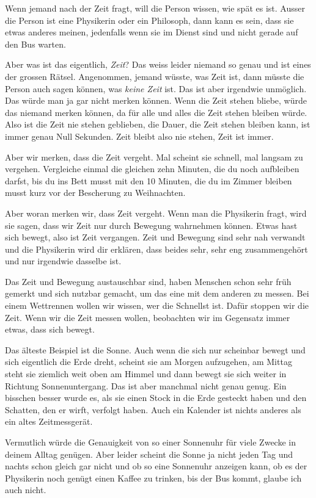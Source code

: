 
\lettrine[lines=2, lhang=.2, loversize=.25, lraise=0.05, findent=0.1em, nindent=0em]{W}{}enn jemand nach der Zeit fragt, will die Person wissen,
wie spät es ist. Ausser die Person ist eine Physikerin oder ein Philosoph, dann
kann es sein, dass sie etwas anderes meinen, jedenfalls wenn sie im Dienst sind
und nicht gerade auf den Bus warten.

Aber was ist das eigentlich, \textit{Zeit}? Das weiss leider niemand so genau
und ist eines der grossen Rätsel. Angenommen, jemand wüsste, was Zeit ist, dann
müsste die Person auch sagen können, was \textit{keine Zeit} ist. Das ist aber
irgendwie unmöglich. Das würde man ja gar nicht merken können. Wenn die Zeit
stehen bliebe, würde das niemand merken können, da für alle und alles die Zeit
stehen bleiben würde. Also ist die Zeit nie stehen geblieben, die Dauer, die
Zeit stehen bleiben kann, ist immer genau Null Sekunden. Zeit bleibt also nie
stehen, Zeit ist immer.

Aber wir merken, dass die Zeit vergeht. Mal scheint sie schnell, mal langsam zu
vergehen. Vergleiche einmal die gleichen zehn Minuten, die du noch aufbleiben
darfst, bis du ins Bett musst mit den 10 Minuten, die du im Zimmer bleiben
musst kurz vor der Bescherung zu Weihnachten.

Aber woran merken wir, dass Zeit vergeht. Wenn man die Physikerin fragt, wird
sie sagen, dass wir Zeit nur durch Bewegung wahrnehmen können. Etwas hast sich
bewegt, also ist Zeit vergangen. Zeit und Bewegung sind sehr nah verwandt und
die Physikerin wird dir erklären, dass beides sehr, sehr eng zusammengehört und
nur irgendwie dasselbe ist.

Das Zeit und Bewegung austauschbar sind, haben Menschen schon sehr früh gemerkt
und sich nutzbar gemacht, um das eine mit dem anderen zu messen. Bei einem
Wettrennen wollen wir wissen, wer die Schnellst ist. Dafür stoppen wir die
Zeit. Wenn wir die Zeit messen wollen, beobachten wir im Gegensatz immer etwas,
dass sich bewegt.

Das älteste Beispiel ist die Sonne. Auch wenn die sich nur scheinbar bewegt und
sich eigentlich die Erde dreht, scheint sie am Morgen aufzugehen, am Mittag
steht sie ziemlich weit oben am Himmel und dann bewegt sie sich weiter in
Richtung Sonnenuntergang. Das ist aber manchmal nicht genau genug. Ein bisschen
besser wurde es, als sie einen Stock in die Erde gesteckt haben und den
Schatten, den er wirft, verfolgt haben. Auch ein Kalender ist nichts anderes
als ein altes Zeitmessgerät.

Vermutlich würde die Genauigkeit von so einer Sonnenuhr für viele Zwecke in
deinem Alltag genügen. Aber leider scheint die Sonne ja nicht jeden Tag und
nachts schon gleich gar nicht und ob so eine Sonnenuhr anzeigen kann, ob es
der Physikerin noch genügt einen Kaffee zu trinken, bis der Bus kommt, glaube
ich auch nicht.

